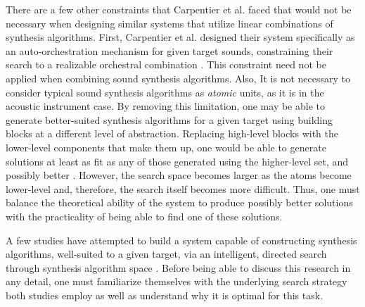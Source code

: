 \documentclass[12pt]{report} 	%
\numberwithin{figure}{chapter}
\numberwithin{table}{chapter}
\numberwithin{equation}{chapter}
\begin{document}
\begin{flushleft}
There are a few other constraints that Carpentier et al. faced that would not be necessary when designing similar systems that utilize linear combinations of synthesis algorithms. First, Carpentier et al. designed their system specifically as an auto-orchestration mechanism for given target sounds, constraining their search to a realizable orchestral combination \cite{Carpentier:2010fh}. This constraint need not be applied when combining sound synthesis algorithms. Also, It is not necessary to consider typical sound synthesis algorithms as \textit{atomic} units, as it is in the acoustic instrument case. By removing this limitation, one may be able to generate better-suited synthesis algorithms for a given target using building blocks at a different level of abstraction. Replacing high-level blocks with the lower-level components that make them up, one would be able to generate solutions at least as fit as any of those generated using the higher-level set, and possibly better \cite[p. 2]{Garcia:2000th}. However, the search space becomes larger as the atoms become lower-level and, therefore, the search itself becomes more difficult. Thus, one must balance the theoretical ability of the system to produce possibly better solutions with the practicality of being able to find one of these solutions. 

A few studies have attempted to build a system capable of constructing synthesis algorithms, well-suited to a given target, via an intelligent, directed search through synthesis algorithm space \cite{Wehn:1998bh, Garcia:2000th, Garcia:2002cq}. Before being able to discuss this research in any detail, one must familiarize themselves with the underlying search strategy both studies employ as well as understand why it is optimal for this task.


\end{flushleft}
\end{document}
